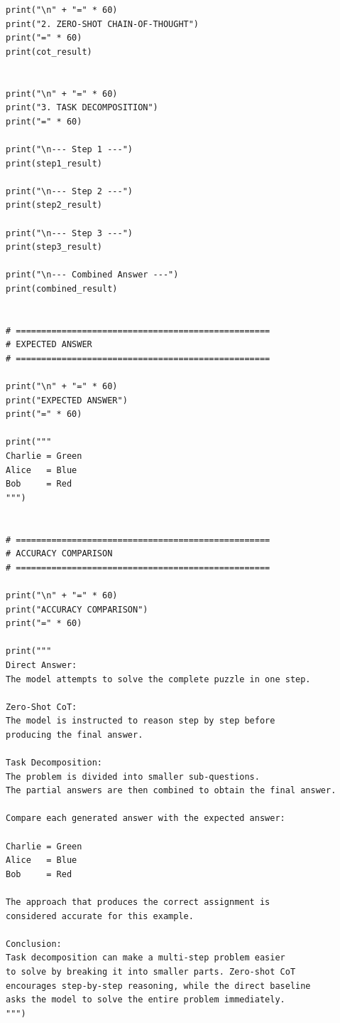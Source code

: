 \documentclass[10pt,a4paper]{article}
\begin{document}
\begin{lstlisting}[style=code]
print("\n" + "=" * 60)
print("2. ZERO-SHOT CHAIN-OF-THOUGHT")
print("=" * 60)
print(cot_result)


print("\n" + "=" * 60)
print("3. TASK DECOMPOSITION")
print("=" * 60)

print("\n--- Step 1 ---")
print(step1_result)

print("\n--- Step 2 ---")
print(step2_result)

print("\n--- Step 3 ---")
print(step3_result)

print("\n--- Combined Answer ---")
print(combined_result)


# ==================================================
# EXPECTED ANSWER
# ==================================================

print("\n" + "=" * 60)
print("EXPECTED ANSWER")
print("=" * 60)

print("""
Charlie = Green
Alice   = Blue
Bob     = Red
""")


# ==================================================
# ACCURACY COMPARISON
# ==================================================

print("\n" + "=" * 60)
print("ACCURACY COMPARISON")
print("=" * 60)

print("""
Direct Answer:
The model attempts to solve the complete puzzle in one step.

Zero-Shot CoT:
The model is instructed to reason step by step before
producing the final answer.

Task Decomposition:
The problem is divided into smaller sub-questions.
The partial answers are then combined to obtain the final answer.

Compare each generated answer with the expected answer:

Charlie = Green
Alice   = Blue
Bob     = Red

The approach that produces the correct assignment is
considered accurate for this example.

Conclusion:
Task decomposition can make a multi-step problem easier
to solve by breaking it into smaller parts. Zero-shot CoT
encourages step-by-step reasoning, while the direct baseline
asks the model to solve the entire problem immediately.
""")
\end{lstlisting}
\end{document}
